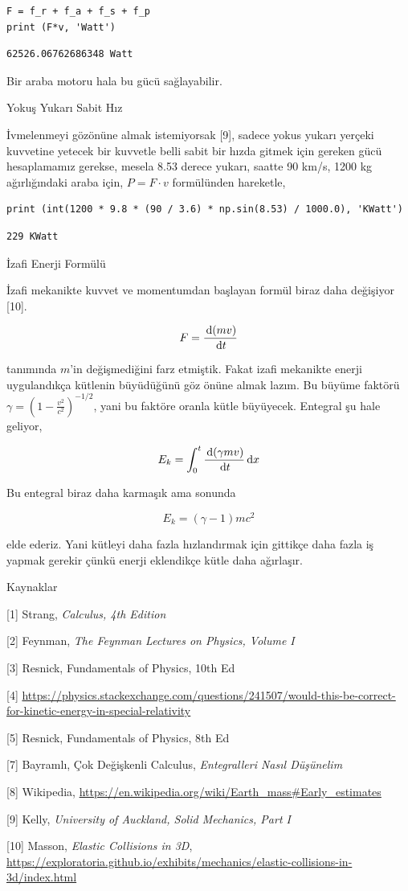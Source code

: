\documentclass[12pt,fleqn]{article}\usepackage{../../common}
\begin{document}
\begin{verbatim}  
F = f_r + f_a + f_s + f_p
print (F*v, 'Watt')
\end{verbatim}

\begin{verbatim}
62526.06762686348 Watt
\end{verbatim}

Bir araba motoru hala bu gücü sağlayabilir.

Yokuş Yukarı Sabit Hız

İvmelenmeyi gözönüne almak istemiyorsak [9], sadece yokus yukarı yerçeki
kuvvetine yetecek bir kuvvetle belli sabit bir hızda gitmek için gereken gücü
hesaplamamız gerekse, mesela 8.53 derece yukarı, saatte 90 km/s, 1200 kg
ağırlığındaki araba için, $P = F \cdot v$ formülünden hareketle,

\begin{verbatim}
print (int(1200 * 9.8 * (90 / 3.6) * np.sin(8.53) / 1000.0), 'KWatt')
\end{verbatim}

\begin{verbatim}
229 KWatt
\end{verbatim}

İzafi Enerji Formülü

İzafi mekanikte kuvvet ve momentumdan başlayan formül biraz daha değişiyor [10].

$$
F = \frac{\,\mathrm{d} (mv)}{\,\mathrm{d} t}
$$

tanımında $m$'in değişmediğini farz etmiştik. Fakat izafi mekanikte enerji
uygulandıkça kütlenin büyüdüğünü göz önüne almak lazım. Bu büyüme faktörü
$\gamma = \left(1 - \frac{v^2}{c^2} \right)^{-1/2}$, yani bu faktöre oranla
kütle büyüyecek. Entegral şu hale geliyor,

$$
E_k = \int _{0}^{t} \frac{\,\mathrm{d} (\gamma mv)}{\,\mathrm{d} t} \,\mathrm{d} x
$$

Bu entegral biraz daha karmaşık ama sonunda

$$
E_k = (\gamma - 1)mc^2
$$

elde ederiz. Yani kütleyi daha fazla hızlandırmak için gittikçe daha fazla iş
yapmak gerekir çünkü enerji eklendikçe kütle daha ağırlaşır. 

Kaynaklar 

[1] Strang, {\em Calculus, 4th Edition}

[2] Feynman, {\em The Feynman Lectures on Physics, Volume I}

[3] Resnick, Fundamentals of Physics, 10th Ed

[4] \url{https://physics.stackexchange.com/questions/241507/would-this-be-correct-for-kinetic-energy-in-special-relativity}

[5] Resnick, Fundamentals of Physics, 8th Ed

[7] Bayramlı, Çok Değişkenli Calculus, {\em Entegralleri Nasıl Düşünelim}

[8] Wikipedia, \url{https://en.wikipedia.org/wiki/Earth_mass#Early_estimates}

[9] Kelly, {\em University of Auckland, Solid Mechanics, Part I}

[10] Masson, {\em Elastic Collisions in 3D}, \url{https://exploratoria.github.io/exhibits/mechanics/elastic-collisions-in-3d/index.html}
\end{document}
